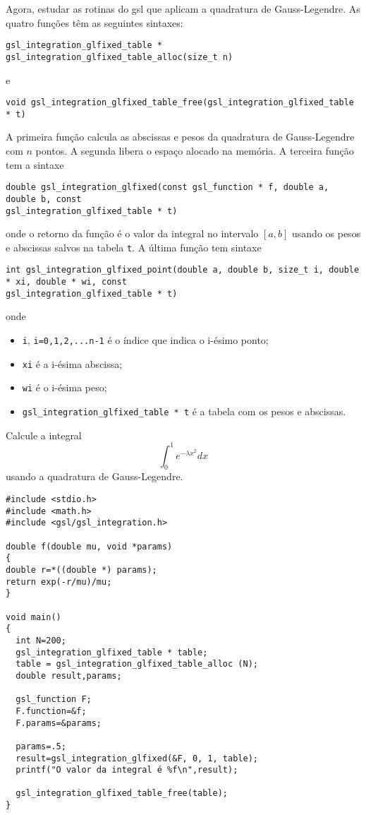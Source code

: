 Agora, estudar as rotinas do gsl que aplicam a quadratura de Gauss-Legendre. As quatro funções têm as seguintes sintaxes:
\begin{verbatim}
gsl_integration_glfixed_table * gsl_integration_glfixed_table_alloc(size_t n)
\end{verbatim}
e
\begin{verbatim}
void gsl_integration_glfixed_table_free(gsl_integration_glfixed_table * t)
\end{verbatim}
A primeira função calcula as abscissas e pesos da quadratura de Gauss-Legendre com $n$ pontos. A segunda libera o espaço alocado na memória. A terceira função tem a sintaxe
\begin{verbatim}
double gsl_integration_glfixed(const gsl_function * f, double a, double b, const
gsl_integration_glfixed_table * t)
\end{verbatim}
onde o retorno da função é o valor da integral no intervalo $[a,b]$ usando os pesos e abscissas salvos na tabela \verb|t|. A última função tem sintaxe
\begin{verbatim}
int gsl_integration_glfixed_point(double a, double b, size_t i, double * xi, double * wi, const
gsl_integration_glfixed_table * t)
\end{verbatim}
onde
\begin{itemize}
 \item \verb|i|, \verb|i=0,1,2,...n-1| é o índice que indica o i-ésimo ponto;
 \item \verb|xi| é a i-ésima abscissa;
 \item \verb|wi| é o i-ésima peso;
 \item \verb|gsl_integration_glfixed_table * t| é a tabela com os pesos e abscissas.
\end{itemize}


\begin{ex}
Calcule a integral
$$
\int_0^1 e^{-\lambda x^2}dx
$$
usando a quadratura de Gauss-Legendre.
\end{ex}
\begin{verbatim}
#include <stdio.h>
#include <math.h>
#include <gsl/gsl_integration.h>

double f(double mu, void *params)
{
double r=*((double *) params);
return exp(-r/mu)/mu;
}

void main()
{
  int N=200;
  gsl_integration_glfixed_table * table;
  table = gsl_integration_glfixed_table_alloc (N);
  double result,params;

  gsl_function F;
  F.function=&f;
  F.params=&params;

  params=.5;
  result=gsl_integration_glfixed(&F, 0, 1, table);
  printf("O valor da integral é %f\n",result);

  gsl_integration_glfixed_table_free(table);
}
\end{verbatim}

